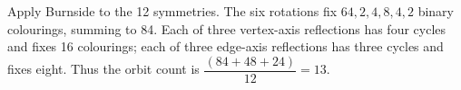 Apply Burnside to the 12 symmetries. The six rotations fix $64,2,4,8,4,2$ binary colourings, summing to 84. Each of three vertex-axis reflections has four cycles and fixes 16 colourings; each of three edge-axis reflections has three cycles and fixes eight. Thus the orbit count is $\dfrac{(84+48+24)}{12}=\boxed{13}$.

